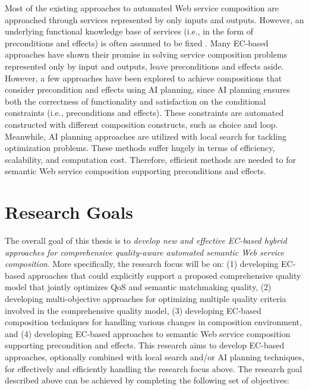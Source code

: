 Most of the existing approaches to automated Web service composition are approached through services represented by only inputs and outputs. However, an underlying functional knowledge base of services (i.e., in the form of preconditions and effects) is often assumed to be fixed \cite{paliwal2012semantics}. Many EC-based approaches have shown their promise in solving service composition problems represented only by input and outputs, leave  preconditions and effects aside. However, a few approaches \cite{bansal2016generalized,DBLP:journals/soca/BoustilMS14} have been explored to achieve compositions that consider precondition and effects using AI planning, since AI planning ensures both the correctness of functionality and satisfaction on the conditional constraints (i.e., preconditions and effects). These constraints are automated constructed with different composition constructs, such as choice and loop. Meanwhile, AI planning approaches are utilized with local search for tackling optimization problems. These methods suffer hugely in terms of efficiency, scalability, and computation cost. Therefore, efficient methods are needed to for semantic Web service composition supporting preconditions and effects.


 
\section{Research Goals}
The overall goal of this thesis is to \emph{develop new and effective EC-based hybrid approaches for comprehensive quality-aware automated semantic Web service composition}. More specifically, the research focus will be on: (1) developing EC-based approaches that could explicitly support a proposed comprehensive quality model that jointly optimizes QoS and semantic matchmaking quality, (2) developing multi-objective approaches for optimizing multiple quality criteria involved in the comprehensive quality model, (3) developing EC-based composition techniques for handling various changes in composition environment, and  (4) developing EC-based approaches to semantic Web service composition supporting precondition and effects. This research aims to develop EC-based approaches, optionally combined with local search and/or AI planning techniques, for effectively and efficiently handling the research focus above. The research goal described above can be achieved by completing the following set of objectives:



